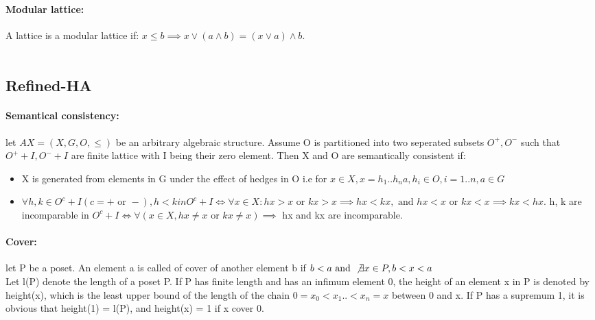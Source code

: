 \documentclass[26pt,fleqn,]{article}
\begin{document}
\paragraph{Modular lattice: } A lattice is a modular lattice if: \(x \le b \implies x \vee (a \wedge b)
= (x \vee a) \wedge b\).\\\\

\subsection{Refined-HA}
\paragraph{Semantical consistency: } let \( AX = (X,G,O,\le)\) be an arbitrary algebraic structure. 
Assume O is partitioned into two seperated subsets \( O^+, O^-\) such that \(O^+ + I, O^- + I\) are 
finite lattice with I being their zero element. Then X and O are semantically consistent if:
\begin{itemize}
	\item X is generated from elements in G under the effect of hedges in O i.e for \(x \in X, 
		x = h_1..h_na, h_i \in O, i = 1..n, a \in G\)
	\item \(\forall h,k \in O^c+I (c = + \text{ or } -), h<k in O^c+I \iff \forall x \in X:
		hx > x \text{ or } kx > x \implies hx < kx, \text{ and } hx < x \text{ or } kx <x
		\implies kx < hx\). h, k are incomparable in \(O^c+I \iff \forall (x \in X, hx \neq x
		\text{ or } kx \neq x) \implies\) hx and kx are incomparable.\\
\end{itemize}
%
\paragraph{Cover: } let P be a poset. An element a is called of cover of another element b if
\(b < a \text{ and } \not \exists x \in P, b < x < a\)\\
Let l(P) denote the length of a poset P. If P has finite length and has an infimum element 0, 
the height of an element x in P is denoted by height(x), which is the least upper bound of the length of
the chain \(0 = x_0<x_1..<x_n = x\) between 0 and x. If P has a supremum 1, it is obvious that height(1)
= l(P), and height(x) = 1 if x cover 0.\\\\
\end{document}
